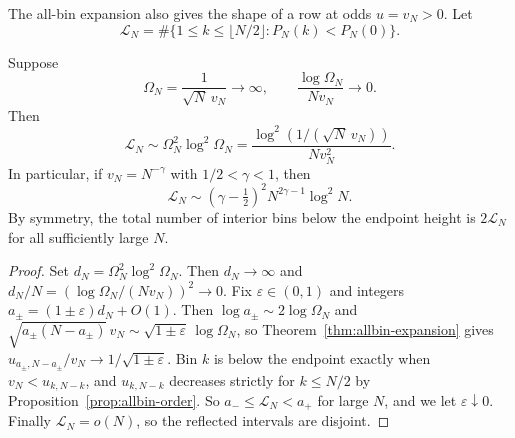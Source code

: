 The all-bin expansion also gives the shape of a row at odds $u=v_N>0$. Let
\[
 \mathcal L_N=\#\{1\le k\le\lfloor N/2\rfloor:P_N(k)<P_N(0)\}.
\]
\begin{corollary}\label{cor:boundary-layer}
Suppose
\[
 \Omega_N=\frac1{\sqrt N\,v_N}\longrightarrow\infty,
 \qquad \frac{\log\Omega_N}{Nv_N}\longrightarrow0.
\]
Then
\begin{equation}\label{eq:boundary-layer-width}
 \mathcal L_N\sim\Omega_N^2\log^2\Omega_N
 =\frac{\log^2(1/(\sqrt N\,v_N))}{Nv_N^2}.
\end{equation}
In particular, if $v_N=N^{-\gamma}$ with $1/2<\gamma<1$, then
\[
 \mathcal L_N\sim(\gamma-\tfrac12)^2N^{2\gamma-1}\log^2N.
\]
By symmetry, the total number of interior bins below the endpoint height
is $2\mathcal L_N$ for all sufficiently large $N$.
\end{corollary}
\begin{proof}
Set $d_N=\Omega_N^2\log^2\Omega_N$. Then $d_N\to\infty$ and
$d_N/N=(\log\Omega_N/(Nv_N))^2\to0$. Fix $\varepsilon\in(0,1)$ and integers
$a_\pm=(1\pm\varepsilon)d_N+O(1)$. Then $\log a_\pm\sim2\log\Omega_N$ and
$\sqrt{a_\pm(N-a_\pm)}\,v_N\sim\sqrt{1\pm\varepsilon}\,\log\Omega_N$, so
Theorem~\ref{thm:allbin-expansion} gives $u_{a_\pm,N-a_\pm}/v_N\to1/\sqrt{1\pm\varepsilon}$.
Bin $k$ is below the endpoint exactly when $v_N<u_{k,N-k}$, and $u_{k,N-k}$
decreases strictly for $k\le N/2$ by Proposition~\ref{prop:allbin-order}. So
$a_-\le\mathcal L_N<a_+$ for large $N$, and we let $\varepsilon\downarrow0$.
Finally $\mathcal L_N=o(N)$, so the
reflected intervals are disjoint.
\end{proof}
